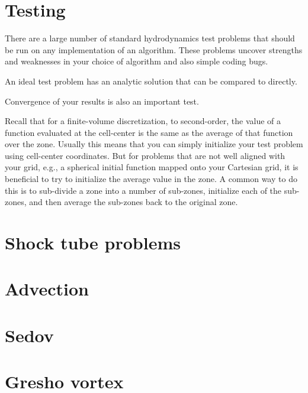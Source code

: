 \section{Testing}

There are a large number of standard hydrodynamics test problems that
should be run on any implementation of an algorithm.  These problems
uncover strengths and weaknesses in your choice of algorithm and also
simple coding bugs.

An ideal test problem has an analytic solution that can be compared to
directly.

Convergence of your results is also an important test.

Recall that for a finite-volume discretization, to second-order, the
value of a function evaluated at the cell-center is the same as the
average of that function over the zone.  Usually this means that you
can simply initialize your test problem using cell-center coordinates.
But for problems that are not well aligned with your grid, e.g., a
spherical initial function mapped onto your Cartesian grid, it is
beneficial to try to initialize the average value in the zone.  A
common way to do this is to sub-divide a zone into a number of
sub-zones, initialize each of the sub-zones, and then average the
sub-zones back to the original zone.  


\section{Shock tube problems}



\section{Advection}


\section{Sedov}



\section{Gresho vortex}



